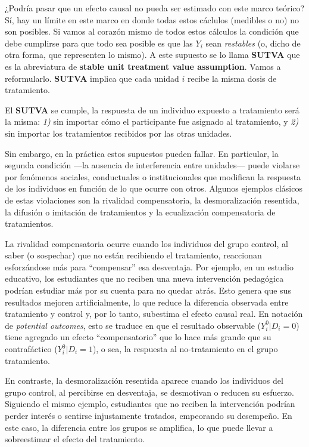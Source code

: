 \documentclass[
  letterpaper,
  DIV=11,
  numbers=noendperiod,
  oneside]{scrreprt}
\begin{document}
¿Podría pasar que un efecto causal no pueda ser estimado con este marco
teórico? Sí, hay un límite en este marco en donde todas estos cáclulos
(medibles o no) no son posibles. Si vamos al corazón mismo de todos
estos cálculos la condición que debe cumplirse para que todo sea posible
es que las \(Y_i\) sean \emph{restables} (o, dicho de otra forma, que
representen lo mismo). A este supuesto se lo llama \textbf{SUTVA} que es
la abreviatura de \textbf{stable unit treatment value assumption}. Vamos
a reformularlo. \textbf{SUTVA} implica que cada unidad \(i\) recibe la
misma dosis de tratamiento.

El \textbf{SUTVA} se cumple, la respuesta de un individuo expuesto a
tratamiento será la misma: \emph{1)} sin importar cómo el participante
fue asignado al tratamiento, y \emph{2)} sin importar los tratamientos
recibidos por las otras unidades.

Sin embargo, en la práctica estos supuestos pueden fallar. En
particular, la segunda condición ---la ausencia de interferencia entre
unidades--- puede violarse por fenómenos sociales, conductuales o
institucionales que modifican la respuesta de los individuos en función
de lo que ocurre con otros. Algunos ejemplos clásicos de estas
violaciones son la rivalidad compensatoria, la desmoralización
resentida, la difusión o imitación de tratamientos y la ecualización
compensatoria de tratamientos.

La rivalidad compensatoria ocurre cuando los individuos del grupo
control, al saber (o sospechar) que no están recibiendo el tratamiento,
reaccionan esforzándose más para ``compensar'' esa desventaja. Por
ejemplo, en un estudio educativo, los estudiantes que no reciben una
nueva intervención pedagógica podrían estudiar más por su cuenta para no
quedar atrás. Esto genera que sus resultados mejoren artificialmente, lo
que reduce la diferencia observada entre tratamiento y control y, por lo
tanto, subestima el efecto causal real. En notación de \emph{potential
outcomes}, esto se traduce en que el resultado observable
(\(Y_i^0|D_i=0\)) tiene agregado un efecto ``compensatorio'' que lo hace
más grande que su contrafáctico (\(Y_i^0|D_i=1\)), o sea, la respuesta
al no-tratamiento en el grupo tratamiento.

En contraste, la desmoralización resentida aparece cuando los individuos
del grupo control, al percibirse en desventaja, se desmotivan o reducen
su esfuerzo. Siguiendo el mismo ejemplo, estudiantes que no reciben la
intervención podrían perder interés o sentirse injustamente tratados,
empeorando su desempeño. En este caso, la diferencia entre los grupos se
amplifica, lo que puede llevar a sobreestimar el efecto del tratamiento.
\end{document}
